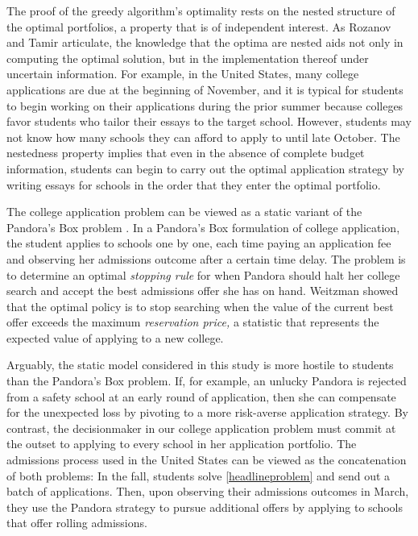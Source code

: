 The proof of the greedy algorithm's optimality rests on the nested structure of the optimal portfolios, a property that is of independent interest. As Rozanov and Tamir \cite{rozanovandtamir2020} articulate, the knowledge that the optima are nested aids not only in computing the optimal solution, but in the implementation thereof under uncertain information. For example, in the United States, many college applications are due at the beginning of November, and it is typical for students to begin working on their applications during the prior summer because colleges favor students who tailor their essays to the target school. However, students may not know how many schools they can afford to apply to until late October. The nestedness property implies that even in the absence of complete budget information, students can begin to carry out the optimal application strategy by writing essays for schools in the order that they enter the optimal portfolio.

The college application problem can be viewed as a static variant of the Pandora's Box problem \cite{weitzman1979,boodaghiansetal2022}. In a Pandora's Box formulation of college application, the student applies to schools one by one, each time paying an application fee and observing her admissions outcome after a certain time delay. The problem is to determine an optimal \emph{stopping rule} for when Pandora should halt her college search and accept the best admissions offer she has on hand. Weitzman \cite{weitzman1979} showed that the optimal policy is to stop searching when the value of the current best offer exceeds the maximum \emph{reservation price,} a statistic that represents the expected value of applying to a new college.

Arguably, the static model considered in this study is more hostile to students than the Pandora's Box problem. If, for example, an unlucky Pandora is rejected from a safety school at an early round of application, then she can compensate for the unexpected loss by pivoting to a more risk-averse application strategy. By contrast, the decisionmaker in our college application problem must commit at the outset to applying to every school in her application portfolio. The admissions process used in the United States can be viewed as the concatenation of both problems: In the fall, students solve \eqref{headlineproblem} and send out a batch of applications. Then, upon observing their admissions outcomes in March, they use the Pandora strategy to pursue additional offers by applying to schools that offer rolling admissions.

